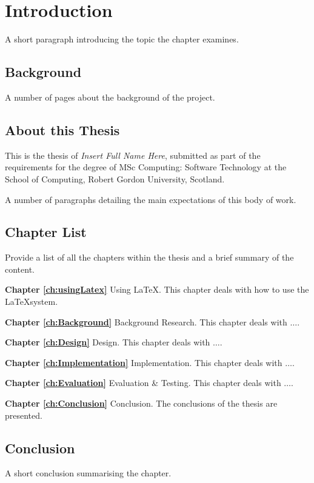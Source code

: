\chapter{Introduction}
 \setcounter{page}{1}

A short paragraph introducing the topic the chapter examines.


\section{Background}

A number of pages about the background of the project.

\section{About this Thesis}
This is the thesis of \emph{Insert Full Name Here}, submitted as part of the requirements for the degree of MSc Computing: Software Technology at the School of Computing, Robert Gordon University, Scotland.

A number of paragraphs detailing the main expectations of this body of work.


\section{Chapter List}
Provide a list of all the chapters within the thesis and a brief summary of the content.

\textbf{Chapter \ref{ch:usingLatex}} Using \LaTeX. This chapter
deals with how to use the \LaTeX \space system.

\textbf{Chapter \ref{ch:Background}} Background Research. This chapter
deals with $\ldots$.

\textbf{Chapter \ref{ch:Design}} Design. This chapter
deals with $\ldots$.

\textbf{Chapter \ref{ch:Implementation}} Implementation. This chapter
deals with $\ldots$.

\textbf{Chapter \ref{ch:Evaluation}} Evaluation \& Testing. This chapter
deals with $\ldots$.

\textbf{Chapter \ref{ch:Conclusion}} Conclusion. The conclusions of the thesis are presented.


\section{Conclusion}
A short conclusion summarising the chapter.
